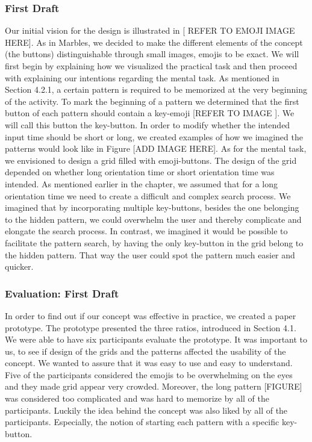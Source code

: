 \subsubsection{First Draft}
Our initial vision for the design is illustrated in [ REFER TO EMOJI IMAGE HERE]. As in Marbles, we decided to make the different elements of the concept (the buttons) distinguishable through small images, emojis to be exact. We will first begin by explaining how we visualized the practical task and then proceed with explaining our intentions regarding the mental task. As mentioned in Section 4.2.1, a certain pattern is required to be memorized at the very beginning of the activity. To mark the beginning of a pattern we determined that the first button of each pattern should contain a key-emoji [REFER TO IMAGE ]. We will call this button the key-button. In order to modify whether the intended input time should be short or long, we created examples of how we imagined the patterns would look like in Figure [ADD IMAGE HERE]. As for the mental task, we envisioned to design a grid filled with emoji-buttons. The design of the grid depended on whether long orientation time or short orientation time was intended. As mentioned earlier in the chapter, we assumed that for a long orientation time we need to create a difficult and complex search process. We imagined that by incorporating multiple key-buttons, besides the one belonging to the hidden pattern, we could overwhelm the user and thereby complicate and elongate the search process. In contrast, we imagined it would be possible to facilitate the pattern search, by having the only key-button in the grid belong to the hidden pattern. That way the user could spot the pattern much easier and quicker.

\subsubsection{Evaluation: First Draft}
In order to find out if our concept was effective in practice, we created a paper prototype. The prototype presented the three ratios, introduced in Section 4.1. We were able to have six participants evaluate the prototype. It was important to us, to see if design of the grids and the patterns affected the usability of the concept. We wanted to assure that it was easy to use and easy to understand.
Five of the participants considered the emojis to be overwhelming on the eyes and they made grid appear very crowded. Moreover, the long pattern [FIGURE] was considered too complicated and was hard to memorize by all of the participants. 
Luckily the idea behind the concept was also liked by all of the participants. Especially, the notion of starting each pattern with a specific key-button. \\

